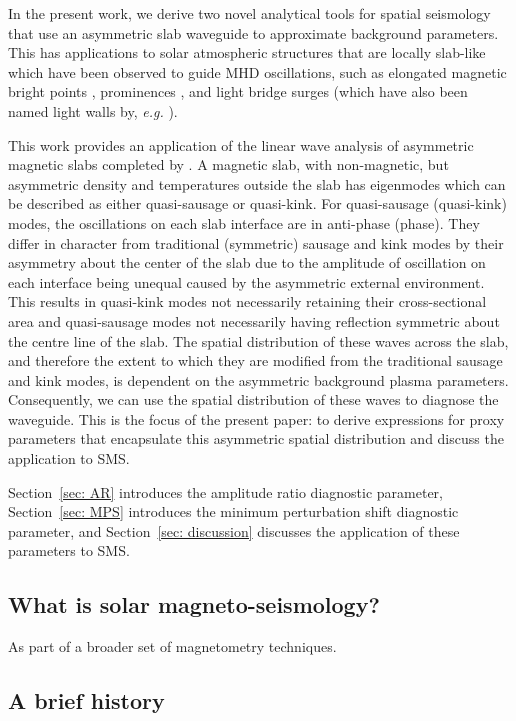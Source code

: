 \documentclass[12pt]{../style-files/ociamthesis}
\begin{document}
{In the present work, we derive two novel analytical tools for spatial seismology that use an asymmetric slab waveguide to approximate background parameters. This has applications to solar atmospheric structures that are locally slab-like which have been observed to guide MHD oscillations, such as elongated magnetic bright points \citep{yua_etal14}, prominences \citep{arr_etal12}, and light bridge surges \citep{roy73,shi_etal09} (which have also been named light walls by, \textit{e.g.} \citealt{yan_etal15,yan_etal17,zha_etal17}).

This work provides an application of the linear wave analysis of asymmetric magnetic slabs completed by \cite{all_etal17}. A magnetic slab, with non-magnetic, but asymmetric density and temperatures outside the slab has eigenmodes which can be described as either quasi-sausage or quasi-kink. For quasi-sausage (quasi-kink) modes, the oscillations on each slab interface are in anti-phase (phase). They differ in character from traditional (symmetric) sausage and kink modes by their asymmetry about the center of the slab due to the amplitude of oscillation on each interface being unequal caused by the asymmetric external environment. This results in quasi-kink modes not necessarily retaining their cross-sectional area and quasi-sausage modes not necessarily having reflection symmetric about the centre line of the slab. The spatial distribution of these waves across the slab, and therefore the extent to which they are modified from the traditional sausage and kink modes, is dependent on the asymmetric background plasma parameters. Consequently, we can use the spatial distribution of these waves to diagnose the waveguide. This is the focus of the present paper: to derive expressions for proxy parameters that encapsulate this asymmetric spatial distribution and discuss the application to SMS.

Section~\ref{sec: AR} introduces the amplitude ratio diagnostic parameter, Section~\ref{sec: MPS} introduces the minimum perturbation shift diagnostic parameter, and Section~\ref{sec: discussion} discusses the application of these parameters to SMS.}
\color{black}


\subsection{What is solar magneto-seismology?}
As part of a broader set of magnetometry techniques.

\subsection{A brief history}
\end{document}

